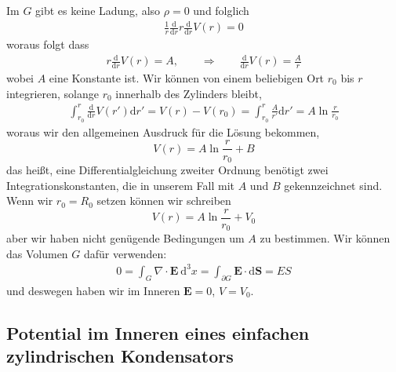 \documentclass[A4paper, 12pt]{amsart}
\begin{document}
Im $ G $ gibt es keine Ladung, also $ \rho =0 $ und folglich
%
\begin{align*}
  \frac{1}{r}
  \frac{\mathrm{d}}{\mathrm{d}r}
  r
  \frac{\mathrm{d}}{\mathrm{d}r}
  V(r)
  =0
\end{align*}
%
woraus folgt dass
\begin{align*}
  r
  \frac{\mathrm{d}}{\mathrm{d}r}
  V(r)
  = A,
  \qquad \Rightarrow \qquad
  \frac{\mathrm{d}}{\mathrm{d}r}
  V(r)
  =
  \frac{A}{r}
\end{align*}
wobei $ A $ eine Konstante ist.
Wir können von einem beliebigen Ort $ r_{0} $ bis $ r $ integrieren, solange
$ r_{0} $ innerhalb des Zylinders bleibt,
%
\begin{align*}
  \int_{r_{0}}^{r}
    \frac{\mathrm{d}}{\mathrm{d}r}
    V(r')
  \mathrm{d} r' =
  V(r) - V(r_{0}) =
  \int_{r_{0}}^{r}
    \frac{A}{r'}
  \mathrm{d} r' =
  A \ln \frac{r}{r_{0}}
\end{align*}
%
woraus wir den allgemeinen Ausdruck für die Lösung bekommen,
%
\begin{equation}
  V(r) =
  A \ln \frac{r}{r_{0}}
  +
  B
\end{equation}
%
das heißt, eine Differentialgleichung zweiter Ordnung benötigt
zwei Integrationskonstanten, die in unserem Fall mit $ A $ und $ B $
gekennzeichnet sind.
Wenn wir $ r_{0} = R_{0}$ setzen können wir schreiben
\begin{equation}
  V(r) =
  A \ln \frac{r}{r_{0}}
  +
  V_{0}
\end{equation}
aber wir haben nicht genügende Bedingungen um $ A $ zu bestimmen.
Wir können das Volumen $ G $ dafür verwenden:
%
\begin{align*}
  0
  =
  \int_{G}
    \nabla \cdot \mathbf{E}
  \ \mathrm{d}^{3} x
  =
  \int_{\partial G}
    \mathbf{E} \cdot \mathrm{d}\mathbf{S}
  =
  E S
\end{align*}
%
und deswegen haben wir im Inneren $ \mathbf{E} = 0 $, $ V = V_{0} $.

\subsection{Potential im Inneren eines einfachen zylindrischen Kondensators}

\begin{center}
  
\end{center}
\end{document}
